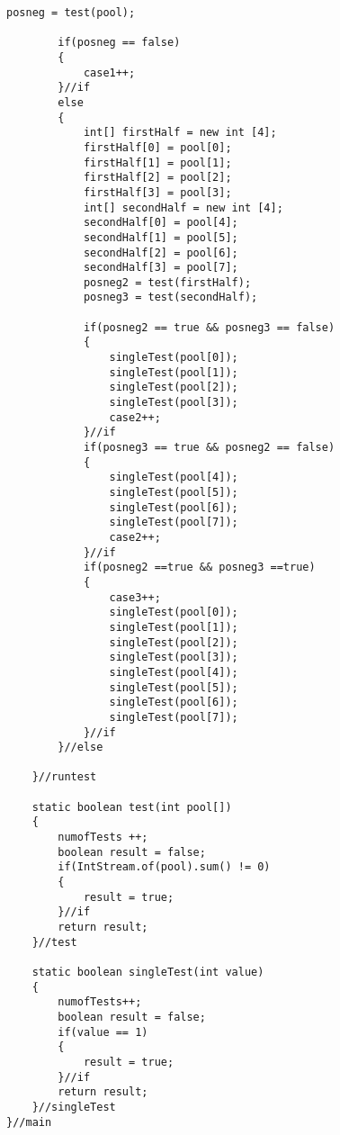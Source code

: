 \documentclass{article}
\begin{document}
\begin{lstlisting}[frame =single,
backgroundcolor = \color{grey!12}]
		posneg = test(pool);
		
		if(posneg == false)
		{
			case1++;
		}//if
		else
		{
			int[] firstHalf = new int [4];
			firstHalf[0] = pool[0];
			firstHalf[1] = pool[1];
			firstHalf[2] = pool[2];
			firstHalf[3] = pool[3];
			int[] secondHalf = new int [4];
			secondHalf[0] = pool[4];
			secondHalf[1] = pool[5];
			secondHalf[2] = pool[6];
			secondHalf[3] = pool[7];
			posneg2 = test(firstHalf);
			posneg3 = test(secondHalf);
			
			if(posneg2 == true && posneg3 == false)
			{
				singleTest(pool[0]);
				singleTest(pool[1]);
				singleTest(pool[2]);
				singleTest(pool[3]);
				case2++;
			}//if
			if(posneg3 == true && posneg2 == false)
			{
				singleTest(pool[4]);
				singleTest(pool[5]);
				singleTest(pool[6]);
				singleTest(pool[7]);
				case2++;
			}//if
			if(posneg2 ==true && posneg3 ==true)
			{
				case3++;
				singleTest(pool[0]);
				singleTest(pool[1]);
				singleTest(pool[2]);
				singleTest(pool[3]);
				singleTest(pool[4]);
				singleTest(pool[5]);
				singleTest(pool[6]);
				singleTest(pool[7]);
			}//if
		}//else
		
	}//runtest
	
	static boolean test(int pool[])
	{
		numofTests ++;
		boolean result = false;
		if(IntStream.of(pool).sum() != 0)
		{
			result = true;
		}//if
		return result;
	}//test
	
	static boolean singleTest(int value)
	{
		numofTests++;
		boolean result = false;
		if(value == 1)
		{
			result = true;
		}//if
		return result;
	}//singleTest
}//main

\end{lstlisting}
\small
\end{document}
